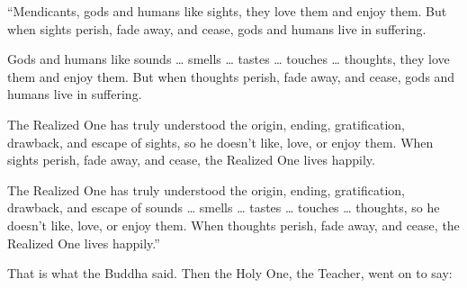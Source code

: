 \documentclass[12pt,openany]{book}%
\begin{document}
“Mendicants, gods and humans like sights, they love them and enjoy them. But when sights perish, fade away, and cease, gods and humans live in suffering. 

Gods and humans like sounds … smells … tastes … touches … thoughts, they love them and enjoy them. But when thoughts perish, fade away, and cease, gods and humans live in suffering. 

The Realized One has truly understood the origin, ending, gratification, drawback, and escape of sights, so he doesn’t like, love, or enjoy them. When sights perish, fade away, and cease, the Realized One lives happily. 

The Realized One has truly understood the origin, ending, gratification, drawback, and escape of sounds … smells … tastes … touches … thoughts, so he doesn’t like, love, or enjoy them. When thoughts perish, fade away, and cease, the Realized One lives happily.” 

That is what the Buddha said. Then the Holy One, the Teacher, went on to say: 
\end{document}
